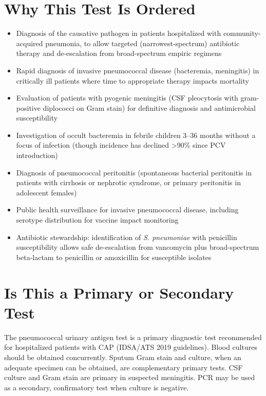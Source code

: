 \section*{Why This Test Is Ordered}
\begin{itemize}
  \item Diagnosis of the causative pathogen in patients hospitalized with community-acquired pneumonia, to allow targeted (narrowest-spectrum) antibiotic therapy and de-escalation from broad-spectrum empiric regimens
  \item Rapid diagnosis of invasive pneumococcal disease (bacteremia, meningitis) in critically ill patients where time to appropriate therapy impacts mortality
  \item Evaluation of patients with pyogenic meningitis (CSF pleocytosis with gram-positive diplococci on Gram stain) for definitive diagnosis and antimicrobial susceptibility
  \item Investigation of occult bacteremia in febrile children 3--36 months without a focus of infection (though incidence has declined >90\% since PCV introduction)
  \item Diagnosis of pneumococcal peritonitis (spontaneous bacterial peritonitis in patients with cirrhosis or nephrotic syndrome, or primary peritonitis in adolescent females)
  \item Public health surveillance for invasive pneumococcal disease, including serotype distribution for vaccine impact monitoring
  \item Antibiotic stewardship: identification of \textit{S. pneumoniae} with penicillin susceptibility allows safe de-escalation from vancomycin plus broad-spectrum beta-lactam to penicillin or amoxicillin for susceptible isolates
\end{itemize}

\section*{Is This a Primary or Secondary Test}
The pneumococcal urinary antigen test is a primary diagnostic test recommended for hospitalized patients with CAP (IDSA/ATS 2019 guidelines). Blood cultures should be obtained concurrently. Sputum Gram stain and culture, when an adequate specimen can be obtained, are complementary primary tests. CSF culture and Gram stain are primary in suspected meningitis. PCR may be used as a secondary, confirmatory test when culture is negative.

